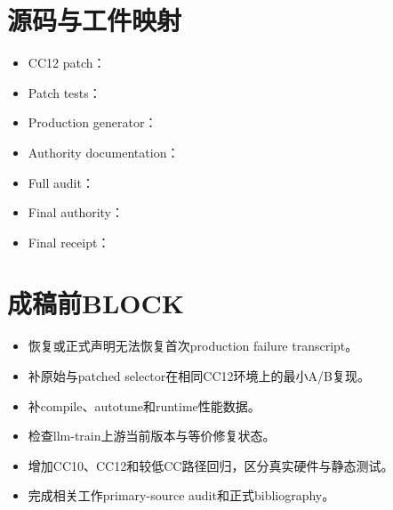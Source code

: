 \documentclass[10.5pt,a4paper]{ctexart}
\begin{document}
\section{源码与工件映射}

\begin{itemize}
  \item CC12 patch：
  \item Patch tests：
  \item Production generator：
  \item Authority documentation：
  \item Full audit：
  \item Final authority：
  \item Final receipt：
\end{itemize}

\section{成稿前BLOCK}

\begin{itemize}
  \item 恢复或正式声明无法恢复首次production failure transcript。
  \item 补原始与patched selector在相同CC12环境上的最小A/B复现。
  \item 补compile、autotune和runtime性能数据。
  \item 检查llm-train上游当前版本与等价修复状态。
  \item 增加CC10、CC12和较低CC路径回归，区分真实硬件与静态测试。
  \item 完成相关工作primary-source audit和正式bibliography。
\end{itemize}
\end{document}
